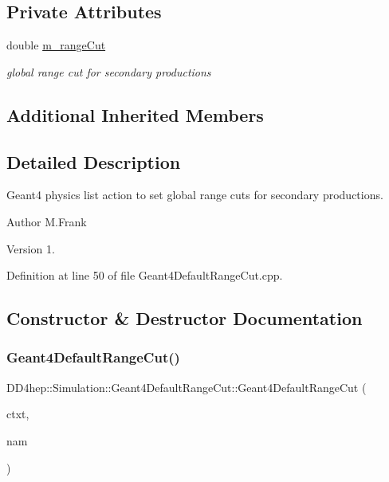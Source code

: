 \subsection*{Private Attributes}
\begin{DoxyCompactItemize}
\item 
double \hyperlink{class_d_d4hep_1_1_simulation_1_1_geant4_default_range_cut_a3a03ddf8f442cefe710b25930bd07f50}{m\+\_\+range\+Cut}
\begin{DoxyCompactList}\small\item\em global range cut for secondary productions \end{DoxyCompactList}\end{DoxyCompactItemize}
\subsection*{Additional Inherited Members}


\subsection{Detailed Description}
Geant4 physics list action to set global range cuts for secondary productions. 

\begin{DoxyAuthor}{Author}
M.\+Frank 
\end{DoxyAuthor}
\begin{DoxyVersion}{Version}
1. 
\end{DoxyVersion}


Definition at line 50 of file Geant4\+Default\+Range\+Cut.\+cpp.



\subsection{Constructor \& Destructor Documentation}
\hypertarget{class_d_d4hep_1_1_simulation_1_1_geant4_default_range_cut_ab3e4d2b49a9aab9f42d04f5c73f7e5b4}{}\label{class_d_d4hep_1_1_simulation_1_1_geant4_default_range_cut_ab3e4d2b49a9aab9f42d04f5c73f7e5b4} 
\subsubsection{\texorpdfstring{Geant4\+Default\+Range\+Cut()}{Geant4DefaultRangeCut()}}
{\footnotesize\ttfamily D\+D4hep\+::\+Simulation\+::\+Geant4\+Default\+Range\+Cut\+::\+Geant4\+Default\+Range\+Cut (\begin{DoxyParamCaption}\item[{\hyperlink{class_d_d4hep_1_1_simulation_1_1_geant4_context}{Geant4\+Context} $\ast$}]{ctxt,  }\item[{const std\+::string \&}]{nam }\end{DoxyParamCaption})\hspace{0.3cm}{\ttfamily [inline]}}



